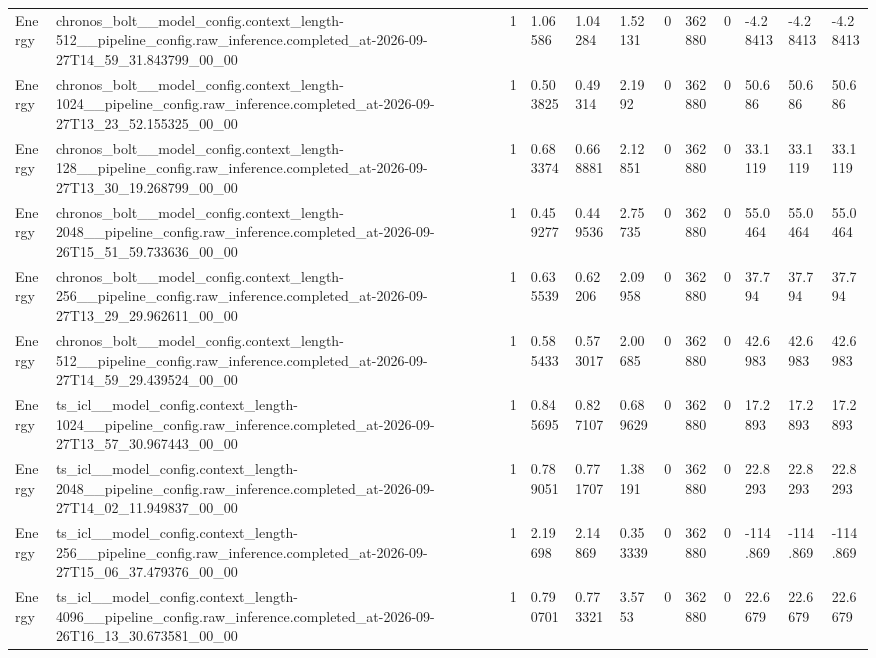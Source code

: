 \begin{tabular}{llllllllllll}
Energy & chronos\_bolt\_\_model\_config.context\_length-512\_\_pipeline\_config.raw\_inference.completed\_at-2026-09-27T14\_59\_31.843799\_00\_00 & 1 & 1.06586 & 1.04284 & 1.52131 & 0 & 362880 & 0 & -4.28413 & -4.28413 & -4.28413 \\
Energy & chronos\_bolt\_\_model\_config.context\_length-1024\_\_pipeline\_config.raw\_inference.completed\_at-2026-09-27T13\_23\_52.155325\_00\_00 & 1 & 0.503825 & 0.49314 & 2.1992 & 0 & 362880 & 0 & 50.686 & 50.686 & 50.686 \\
Energy & chronos\_bolt\_\_model\_config.context\_length-128\_\_pipeline\_config.raw\_inference.completed\_at-2026-09-27T13\_30\_19.268799\_00\_00 & 1 & 0.683374 & 0.668881 & 2.12851 & 0 & 362880 & 0 & 33.1119 & 33.1119 & 33.1119 \\
Energy & chronos\_bolt\_\_model\_config.context\_length-2048\_\_pipeline\_config.raw\_inference.completed\_at-2026-09-26T15\_51\_59.733636\_00\_00 & 1 & 0.459277 & 0.449536 & 2.75735 & 0 & 362880 & 0 & 55.0464 & 55.0464 & 55.0464 \\
Energy & chronos\_bolt\_\_model\_config.context\_length-256\_\_pipeline\_config.raw\_inference.completed\_at-2026-09-27T13\_29\_29.962611\_00\_00 & 1 & 0.635539 & 0.62206 & 2.09958 & 0 & 362880 & 0 & 37.794 & 37.794 & 37.794 \\
Energy & chronos\_bolt\_\_model\_config.context\_length-512\_\_pipeline\_config.raw\_inference.completed\_at-2026-09-27T14\_59\_29.439524\_00\_00 & 1 & 0.585433 & 0.573017 & 2.00685 & 0 & 362880 & 0 & 42.6983 & 42.6983 & 42.6983 \\
Energy & ts\_icl\_\_model\_config.context\_length-1024\_\_pipeline\_config.raw\_inference.completed\_at-2026-09-27T13\_57\_30.967443\_00\_00 & 1 & 0.845695 & 0.827107 & 0.689629 & 0 & 362880 & 0 & 17.2893 & 17.2893 & 17.2893 \\
Energy & ts\_icl\_\_model\_config.context\_length-2048\_\_pipeline\_config.raw\_inference.completed\_at-2026-09-27T14\_02\_11.949837\_00\_00 & 1 & 0.789051 & 0.771707 & 1.38191 & 0 & 362880 & 0 & 22.8293 & 22.8293 & 22.8293 \\
Energy & ts\_icl\_\_model\_config.context\_length-256\_\_pipeline\_config.raw\_inference.completed\_at-2026-09-27T15\_06\_37.479376\_00\_00 & 1 & 2.19698 & 2.14869 & 0.353339 & 0 & 362880 & 0 & -114.869 & -114.869 & -114.869 \\
Energy & ts\_icl\_\_model\_config.context\_length-4096\_\_pipeline\_config.raw\_inference.completed\_at-2026-09-26T16\_13\_30.673581\_00\_00 & 1 & 0.790701 & 0.773321 & 3.5753 & 0 & 362880 & 0 & 22.6679 & 22.6679 & 22.6679 \\

\end{tabular}
